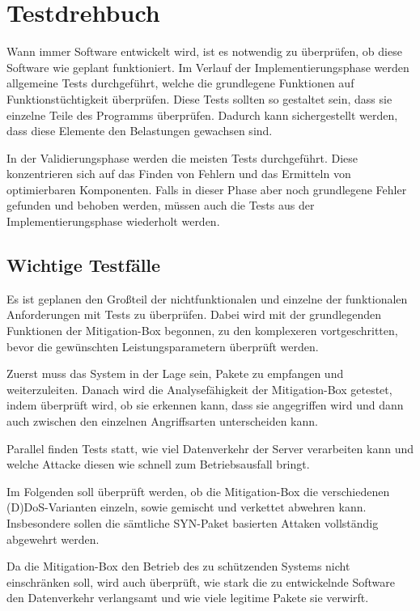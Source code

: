 \documentclass[../review_1.tex]{subfiles}
\begin{document}
\chapter{Testdrehbuch}\thispagestyle{fancy}

Wann immer Software entwickelt wird, ist es notwendig zu überprüfen, ob diese Software wie geplant funktioniert. Im Verlauf der Implementierungsphase werden allgemeine Tests durchgeführt, welche die grundlegene Funktionen auf Funktionstüchtigkeit überprüfen. Diese Tests sollten so gestaltet sein, dass sie einzelne Teile des Programms überprüfen. Dadurch kann sichergestellt werden, dass diese Elemente den Belastungen gewachsen sind.

In der Validierungsphase werden die meisten Tests durchgeführt. Diese konzentrieren sich auf das Finden von Fehlern und das Ermitteln von optimierbaren Komponenten. Falls in dieser Phase aber noch grundlegene Fehler gefunden und behoben werden, müssen auch die Tests aus der Implementierungsphase wiederholt werden.

\section{Wichtige Testfälle}
Es ist geplanen den Großteil der nichtfunktionalen und einzelne der funktionalen Anforderungen mit Tests zu überprüfen. Dabei wird mit der grundlegenden Funktionen der Mitigation-Box begonnen, zu den komplexeren vortgeschritten, bevor die gewünschten Leistungsparametern überprüft werden.

Zuerst muss das System in der Lage sein, Pakete zu empfangen und weiterzuleiten. Danach wird die Analysefähigkeit der Mitigation-Box getestet, indem überprüft wird, ob sie erkennen kann, dass sie angegriffen wird und dann auch zwischen den einzelnen Angriffsarten unterscheiden kann.

Parallel finden Tests statt, wie viel Datenverkehr der Server verarbeiten kann und welche Attacke diesen wie schnell zum Betriebsausfall bringt.

Im Folgenden soll überprüft werden, ob die Mitigation-Box die verschiedenen (D)DoS-Varianten einzeln, sowie gemischt und verkettet abwehren kann. Insbesondere sollen die sämtliche SYN-Paket basierten Attaken vollständig abgewehrt werden.

Da die Mitigation-Box den Betrieb des zu schützenden Systems nicht einschränken soll, wird auch überprüft, wie stark die zu entwickelnde Software den Datenverkehr verlangsamt und wie viele legitime Pakete sie verwirft.
\end{document}
